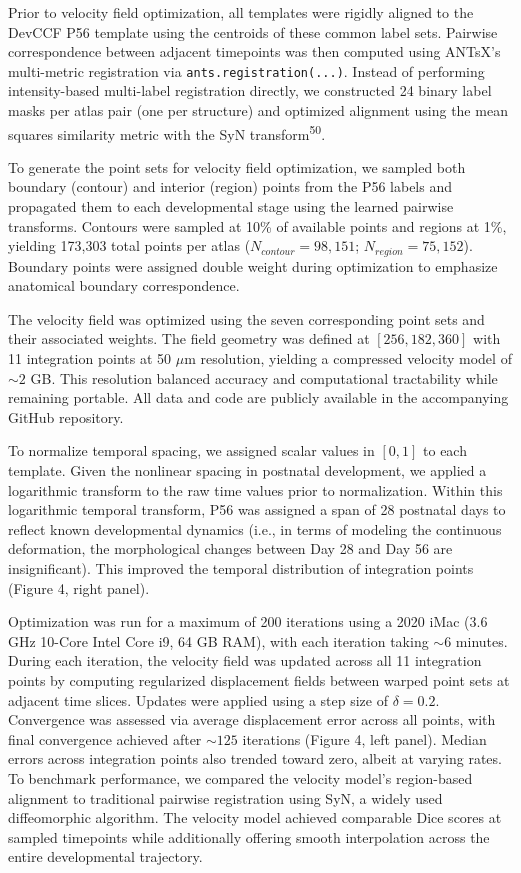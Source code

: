 \documentclass[
  12pt,
]{article}
\begin{document}
Prior to velocity field optimization, all templates were rigidly aligned
to the DevCCF P56 template using the centroids of these common label
sets. Pairwise correspondence between adjacent timepoints was then
computed using ANTsX's multi-metric registration via
\texttt{ants.registration(...)}. Instead of performing intensity-based
multi-label registration directly, we constructed 24 binary label masks
per atlas pair (one per structure) and optimized alignment using the
mean squares similarity metric with the SyN
transform\textsuperscript{50}.

To generate the point sets for velocity field optimization, we sampled
both boundary (contour) and interior (region) points from the P56 labels
and propagated them to each developmental stage using the learned
pairwise transforms. Contours were sampled at 10\% of available points
and regions at 1\%, yielding 173,303 total points per atlas
(\(N_{contour} = 98{,}151\); \(N_{region} =
75{,}152\)). Boundary points were assigned double weight during
optimization to emphasize anatomical boundary correspondence.

The velocity field was optimized using the seven corresponding point
sets and their associated weights. The field geometry was defined at
\([256, 182, 360]\) with 11 integration points at 50 \(\mu\)m
resolution, yielding a compressed velocity model of \(\sim2\) GB. This
resolution balanced accuracy and computational tractability while
remaining portable. All data and code are publicly available in the
accompanying GitHub repository.

To normalize temporal spacing, we assigned scalar values in \([0, 1]\)
to each template. Given the nonlinear spacing in postnatal development,
we applied a logarithmic transform to the raw time values prior to
normalization. Within this logarithmic temporal transform, P56 was
assigned a span of 28 postnatal days to reflect known developmental
dynamics (i.e., in terms of modeling the continuous deformation, the
morphological changes between Day 28 and Day 56 are insignificant). This
improved the temporal distribution of integration points (Figure 4,
right panel).

Optimization was run for a maximum of 200 iterations using a 2020 iMac
(3.6 GHz 10-Core Intel Core i9, 64 GB RAM), with each iteration taking
\(\sim6\) minutes. During each iteration, the velocity field was updated
across all 11 integration points by computing regularized displacement
fields between warped point sets at adjacent time slices. Updates were
applied using a step size of \(\delta = 0.2\). Convergence was assessed
via average displacement error across all points, with final convergence
achieved after \(\sim125\) iterations (Figure 4, left panel). Median
errors across integration points also trended toward zero, albeit at
varying rates. To benchmark performance, we compared the velocity
model's region-based alignment to traditional pairwise registration
using SyN, a widely used diffeomorphic algorithm. The velocity model
achieved comparable Dice scores at sampled timepoints while additionally
offering smooth interpolation across the entire developmental
trajectory.
\end{document}
